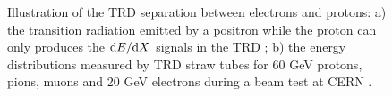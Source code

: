 \begin{figure}[H] 
\centering   
{}    
\caption[Illustration of the TRD separation between electrons and protons.]{Illustration of the TRD separation between electrons and protons: a) the transition radiation emitted by a positron while the proton can only produces the ${\rm{d}}E/{\rm{d}}X$ signals in the TRD \cite{AMSWebside}; b) the energy distributions measured by TRD straw tubes for 60 GeV protons, pions, muons and 20 GeV electrons during a beam test at CERN \cite{TRD_DEDXPaper}. }
\label{TRDdEdX} 
\end{figure}








